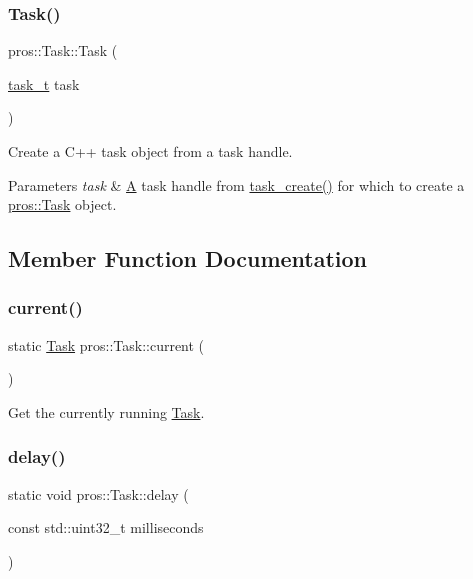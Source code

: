 \subsubsection{\texorpdfstring{Task()}{Task()}\hspace{0.1cm}{\footnotesize\ttfamily [2/2]}}
{\footnotesize\ttfamily pros\+::\+Task\+::\+Task (\begin{DoxyParamCaption}\item[{\mbox{\hyperlink{rtos_8h_a1d7e0825b8d8876e8cd8ece3f9115293}{task\+\_\+t}}}]{task }\end{DoxyParamCaption})}



Create a C++ task object from a task handle. 


\begin{DoxyParams}{Parameters}
{\em task} & \mbox{\hyperlink{structA}{A}} task handle from \mbox{\hyperlink{rtos_8h_a2e3ed8f26b8c1edcff493bc583f0a76a}{task\+\_\+create()}} for which to create a \mbox{\hyperlink{classpros_1_1Task}{pros\+::\+Task}} object. \\
\hline
\end{DoxyParams}


\subsection{Member Function Documentation}
\mbox{\label{classpros_1_1Task_a510ca3e67e54aa4293438d73148a1d6b}} 
\subsubsection{\texorpdfstring{current()}{current()}}
{\footnotesize\ttfamily static \mbox{\hyperlink{classpros_1_1Task}{Task}} pros\+::\+Task\+::current (\begin{DoxyParamCaption}{ }\end{DoxyParamCaption})\hspace{0.3cm}{\ttfamily [static]}}



Get the currently running \mbox{\hyperlink{classpros_1_1Task}{Task}}. 

\mbox{\label{classpros_1_1Task_a4341b580544831eea11b840cf068587b}} 
\subsubsection{\texorpdfstring{delay()}{delay()}}
{\footnotesize\ttfamily static void pros\+::\+Task\+::delay (\begin{DoxyParamCaption}\item[{const std\+::uint32\+\_\+t}]{milliseconds }\end{DoxyParamCaption})\hspace{0.3cm}{\ttfamily [static]}}



